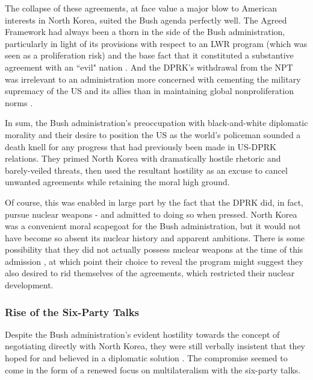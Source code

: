 \documentclass{article}
\begin{document}
The collapse of these agreements, at face value a major blow to American interests in North Korea, suited the Bush agenda perfectly well. The Agreed Framework had always been a thorn in the side of the Bush administration, particularly in light of its provisions with respect to an LWR program (which was seen as a proliferation risk) and the base fact that it constituted a substantive agreement with an ``evil" nation \cite{harnisch}. And the DPRK's withdrawal from the NPT was irrelevant to an administration more concerned with cementing the military supremacy of the US and its allies than in maintaining global nonproliferation norms \cite{huntley}.

In sum, the Bush administration's preoccupation with black-and-white diplomatic morality and their desire to position the US as the world's policeman sounded a death knell for any progress that had previously been made in US-DPRK relations. They primed North Korea with dramatically hostile rhetoric and barely-veiled threats, then used the resultant hostility as an excuse to cancel unwanted agreements while retaining the moral high ground.

Of course, this was enabled in large part by the fact that the DPRK did, in fact, pursue nuclear weapons - and admitted to doing so when pressed. North Korea was a convenient moral scapegoat for the Bush administration, but it would not have become so absent its nuclear history and apparent ambitions. There is some possibility that they did not actually possess nuclear weapons at the time of this admission \cite{harnisch}, at which point their choice to reveal the program might suggest they also desired to rid themselves of the agreements, which restricted their nuclear development. 


\subsubsection{Rise of the Six-Party Talks}

Despite the Bush administration's evident hostility towards the concept of negotiating directly with North Korea, they were still verbally insistent that they hoped for and believed in a diplomatic solution \cite{bleiker}. The compromise seemed to come in the form of a renewed focus on multilateralism with the six-party talks.
\end{document}
